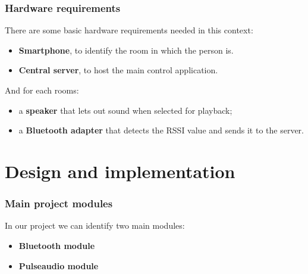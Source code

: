 \documentclass{beamer}
\begin{document}
	\begin{frame}
		\frametitle{Hardware requirements}
		There are some basic hardware requirements needed in this context:
		\pause
		\begin{itemize}
		\item \textbf{Smartphone}, to identify the room in which the person is.
		\item \textbf{Central server}, to host the main control application.
		\end{itemize}
		\pause
		And for each rooms:
		\begin{itemize}
		\item a \textbf{speaker} that lets out sound when selected for playback;
		\item a \textbf{Bluetooth adapter} that detects the RSSI value and sends it to the server.
		\end{itemize}
		
		 
		
	\end{frame}
	

\section{Design and implementation}

	\begin{frame}
	\frametitle{Main project modules}
		In our project we can identify two main modules:
		\begin{itemize}
		\item \textbf{Bluetooth module}
		\item \textbf{Pulseaudio module}
		\end{itemize}
	\end{frame}
\end{document}
